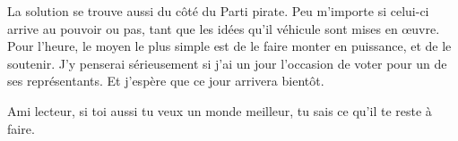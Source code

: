 La solution se trouve aussi du côté du Parti pirate.
Peu m'importe si celui-ci arrive au pouvoir ou pas, tant que les idées qu'il véhicule sont mises en œuvre.
Pour l'heure, le moyen le plus simple est de le faire monter en puissance, et de le soutenir.
J'y penserai sérieusement si j'ai un jour l'occasion de voter pour un de ses représentants.
Et j'espère que ce jour arrivera bientôt.

Ami lecteur, si toi aussi tu veux un monde meilleur, tu sais ce qu'il te reste à faire.

